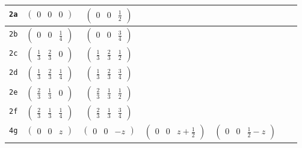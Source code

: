 \documentclass[fleqn,9pt,landscape]{jsarticle}
\begin{document}
\begin{center}
\begin{longtable}{ccccccc}
{\tt 2a} & $ \begin{pmatrix} 0 & 0 & 0 \end{pmatrix} $ & $ \begin{pmatrix} 0 & 0 & \frac{1}{2} \end{pmatrix} $ & $  $ & $  $ & $  $ & $  $ \\ \hline
{\tt 2b} & $ \begin{pmatrix} 0 & 0 & \frac{1}{4} \end{pmatrix} $ & $ \begin{pmatrix} 0 & 0 & \frac{3}{4} \end{pmatrix} $ & $  $ & $  $ & $  $ & $  $ \\ \hline
{\tt 2c} & $ \begin{pmatrix} \frac{1}{3} & \frac{2}{3} & 0 \end{pmatrix} $ & $ \begin{pmatrix} \frac{1}{3} & \frac{2}{3} & \frac{1}{2} \end{pmatrix} $ & $  $ & $  $ & $  $ & $  $ \\ \hline
{\tt 2d} & $ \begin{pmatrix} \frac{1}{3} & \frac{2}{3} & \frac{1}{4} \end{pmatrix} $ & $ \begin{pmatrix} \frac{1}{3} & \frac{2}{3} & \frac{3}{4} \end{pmatrix} $ & $  $ & $  $ & $  $ & $  $ \\ \hline
{\tt 2e} & $ \begin{pmatrix} \frac{2}{3} & \frac{1}{3} & 0 \end{pmatrix} $ & $ \begin{pmatrix} \frac{2}{3} & \frac{1}{3} & \frac{1}{2} \end{pmatrix} $ & $  $ & $  $ & $  $ & $  $ \\ \hline
{\tt 2f} & $ \begin{pmatrix} \frac{2}{3} & \frac{1}{3} & \frac{1}{4} \end{pmatrix} $ & $ \begin{pmatrix} \frac{2}{3} & \frac{1}{3} & \frac{3}{4} \end{pmatrix} $ & $  $ & $  $ & $  $ & $  $ \\ \hline
{\tt 4g} & $ \begin{pmatrix} 0 & 0 & z \end{pmatrix} $ & $ \begin{pmatrix} 0 & 0 & - z \end{pmatrix} $ & $ \begin{pmatrix} 0 & 0 & z + \frac{1}{2} \end{pmatrix} $ & $ \begin{pmatrix} 0 & 0 & \frac{1}{2} - z \end{pmatrix} $ & $  $ & $  $ \\ \hline

\end{longtable}
\end{center}
\end{document}
